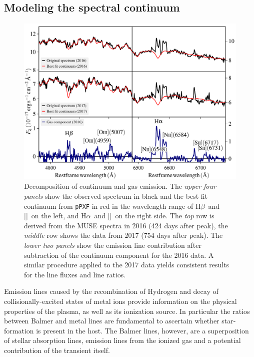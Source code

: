 \documentclass[traditabstract]{aa}
\newcommand{\hb}{H$\beta$}
\newcommand{\ha}{H$\alpha$}
\newcommand{\oiii}{[\ion{O}{iii}]}
\newcommand{\nii}{[\ion{N}{ii}]}
\begin{document}
\subsection{Modeling the spectral continuum}
\label{sec:pPXF}

\begin{figure}
  \includegraphics[width=0.999\linewidth]{fig/MUSE_stargas.pdf}
\caption{Decomposition of continuum and gas emission. The \textit{upper four panels} show the observed spectrum in black and the best fit continuum from \texttt{pPXF} in red in the wavelength range of \hb~and \oiii~on the left, and \ha~and \nii~on the right side. The \textit{top} row is derived from the MUSE spectra in 2016 (424 days after peak), the \textit{middle} row shows the data from 2017 (754 days after peak). The \textit{lower two panels} show the emission line contribution 
after subtraction of the continuum component for the 2016 data. A similar procedure applied to the 2017 data yields consistent results for the line fluxes and line ratios.}
\label{fig:stargas}
\end{figure}

Emission lines caused by the recombination of Hydrogen and decay of collisionally-excited states of metal ions provide information on the physical properties of the plasma, as well as its ionization source. In particular the ratios between Balmer and metal lines are fundamental to ascertain whether star-formation is present in the host. The Balmer lines, however, are a superposition of stellar absorption lines, emission lines from the ionized gas and a potential contribution of the transient itself. 
\end{document}
